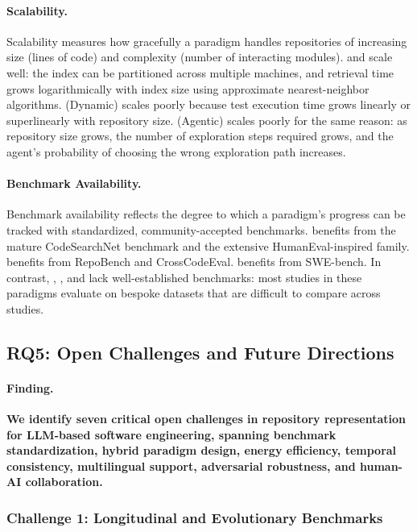 \paragraph{Scalability.}
Scalability measures how gracefully a paradigm handles repositories of increasing size (lines
of code) and complexity (number of interacting modules).  and  scale
well: the index can be partitioned across multiple machines, and retrieval time grows
logarithmically with index size using approximate nearest-neighbor algorithms. 
(Dynamic) scales poorly because test execution time grows linearly or superlinearly with
repository size.  (Agentic) scales poorly for the same reason: as repository size
grows, the number of exploration steps required grows, and the agent's probability of choosing
the wrong exploration path increases.

\paragraph{Benchmark Availability.}
Benchmark availability reflects the degree to which a paradigm's progress can be tracked with
standardized, community-accepted benchmarks.  benefits from the mature CodeSearchNet
benchmark and the extensive HumanEval-inspired family.  benefits from RepoBench
and CrossCodeEval.  benefits from SWE-bench. In contrast, , ,
and  lack well-established benchmarks: most studies in these paradigms evaluate on
bespoke datasets that are difficult to compare across studies.

\subsection{RQ5: Open Challenges and Future Directions}
\label{subsec:rq5}

\paragraph{Finding.}
\textbf{We identify seven critical open challenges in repository representation for LLM-based
software engineering, spanning benchmark standardization, hybrid paradigm design, energy
efficiency, temporal consistency, multilingual support, adversarial robustness, and
human-AI collaboration.}

\subsubsection{Challenge 1: Longitudinal and Evolutionary Benchmarks}

